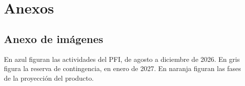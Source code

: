 {}
\chapter{Anexos}
\label{chap:anexo_imagenes}

\section{Anexo de imágenes}


    En azul figuran las actividades del PFI, de agosto a diciembre de 2026. En gris figura la reserva de contingencia, en enero de 2027. En naranja figuran las fases de la proyección del producto.

